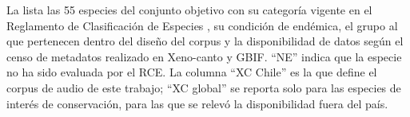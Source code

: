 La  lista las 55 especies del conjunto objetivo con
su categoría vigente en el Reglamento de Clasificación de Especies
\citep{mma2026rce}, su condición de endémica, el grupo al que pertenecen dentro
del diseño del corpus y la disponibilidad de datos según el censo de metadatos
realizado en Xeno-canto y GBIF. ``NE'' indica que la especie no ha sido
evaluada por el RCE. La columna ``XC Chile'' es la que define el corpus de
audio de este trabajo; ``XC global'' se reporta solo para las especies de
interés de conservación, para las que se relevó la disponibilidad fuera del
país.

\setlength{\tabcolsep}{2.5pt}
